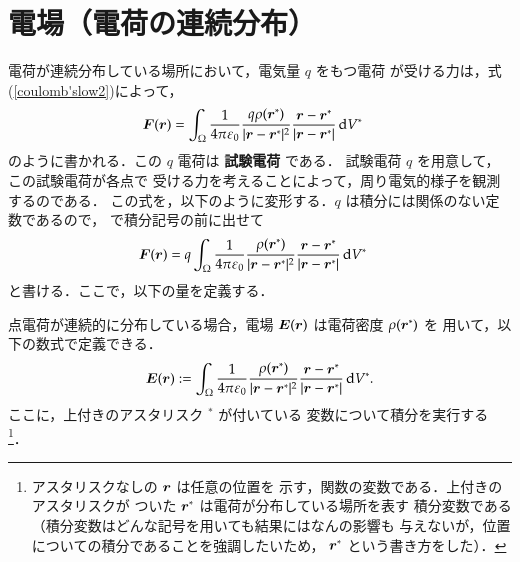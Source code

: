             \section{電場（電荷の連続分布）}
            電荷が連続分布している場所において，電気量 $q$ をもつ電荷
            が受ける力は，式(\ref{coulomb'slow2})によって，
                \begin{align}
                    \boldsymbol{F}(\boldsymbol{r})
                    &=\int_\Omega \frac{1}{4\pi\varepsilon_{0}}
                    \frac{q\rho(\boldsymbol{r}^{*})}{|\boldsymbol{r}-\boldsymbol{r}^{*}|^{2}}
                    \frac{\boldsymbol{r}-\boldsymbol{r}^{*}}
                         {|\boldsymbol{r}-\boldsymbol{r}^{*}|}\,\mathrm{d} V^{*}
                \end{align}
            のように書かれる．この $q$ 電荷は \textbf{試験電荷} である．
            試験電荷 $q$ を用意して，この試験電荷が各点で
            受ける力を考えることによって，周り電気的様子を観測するのである．
            この式を，以下のように変形する．$q$ は積分には関係のない定数であるので，
            で積分記号の前に出せて
                \begin{align}
                    \boldsymbol{F}(\boldsymbol{r})
                    &=q\int_\Omega \frac{1}{4\pi\varepsilon_{0}}
                    \frac{\rho(\boldsymbol{r}^{*})}{|\boldsymbol{r}-\boldsymbol{r}^{*}|^{2}}
                    \frac{\boldsymbol{r}-\boldsymbol{r}^{*}}
                         {|\boldsymbol{r}-\boldsymbol{r}^{*}|}\,\mathrm{d} V^{*}
                \end{align}
            と書ける．ここで，以下の量を定義する．

            点電荷が連続的に分布している場合，電場 $\boldsymbol{E}(\boldsymbol{r})$ は電荷密度 $\rho(\boldsymbol{r}^{*})$ を
            用いて，以下の数式で定義できる．
                \begin{align}
                    \boldsymbol{E}(\boldsymbol{r})
                    :=\int_\Omega \frac{1}{4\pi\varepsilon_{0}}
                    \frac{\rho(\boldsymbol{r}^{*})}{|\boldsymbol{r}-\boldsymbol{r}^{*}|^{2}}
                    \frac{\boldsymbol{r}-\boldsymbol{r}^{*}}
                    {|\boldsymbol{r}-\boldsymbol{r}^{*}|}\,\mathrm{d} V^{*}.
                \end{align}
             ここに，上付きのアスタリスク ${}^{*}$ が付いている
             変数について積分を実行する
                 \footnote{
                     アスタリスクなしの $\boldsymbol{r}$ は任意の位置を
                     示す，関数の変数である．上付きのアスタリスクが
                     ついた $\boldsymbol{r}^{*}$ は電荷が分布している場所を表す
                     積分変数である
                     （積分変数はどんな記号を用いても結果にはなんの影響も
                     与えないが，位置についての積分であることを強調したいため，
                     $\boldsymbol{r}^{*}$ という書き方をした）．
                 }．

